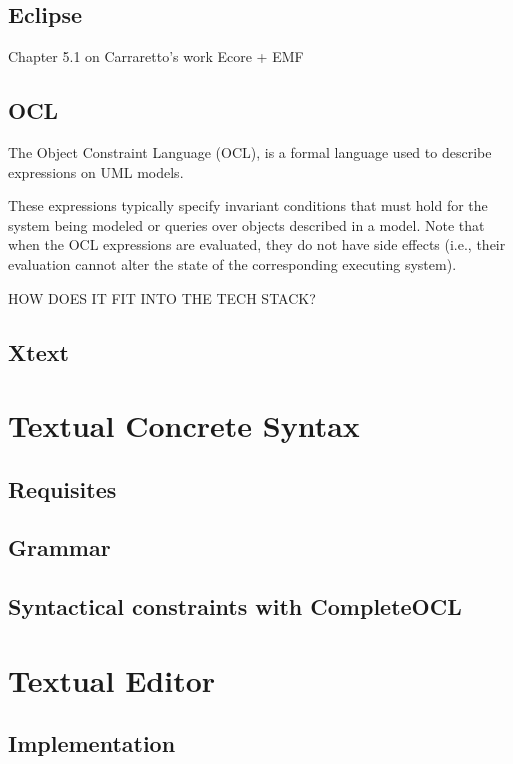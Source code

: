 \documentclass[
	10pt,				%
	oneside,
	a4paper,			%
	brazil,
	english
	]{abntex2}
\begin{document}
\section{Eclipse}

Chapter 5.1 on Carraretto's work
Ecore + EMF

\section{OCL}

The Object Constraint Language (OCL)\cite{OCL20}, is a formal language used to
describe expressions on UML models.

These expressions typically specify invariant conditions that must hold for the
system being modeled or queries over objects described in a model. Note that when
the OCL expressions are evaluated, they do not have side effects (i.e., their
evaluation cannot alter the state of the corresponding executing system).

HOW DOES IT FIT INTO THE TECH STACK?

\section{Xtext}

\chapter{Textual Concrete Syntax}

\section{Requisites}

\section{Grammar}

\section{Syntactical constraints with CompleteOCL}

\chapter{Textual Editor}

\section{Implementation}
\end{document}

